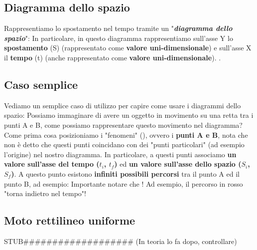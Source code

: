	\subsection{Diagramma dello spazio}
		Rappresentiamo lo spostamento nel tempo tramite un "\textit{\textbf{diagramma dello spazio}}":
		In particolare, in questo diagramma rappresentiamo sull'asse Y lo \textbf{spostamento} (S) (rappresentato come \textbf{valore uni-dimensionale}) e sull'asse X il \textbf{tempo} (t) (anche rappresentato come \textbf{valore uni-dimensionale}). .

	\subsection{Caso semplice}
		Vediamo un semplice caso di utilizzo per capire come usare i diagrammi dello spazio:
		Possiamo immaginare di avere un oggetto in movimento su una retta tra i punti A e B, come possiamo rappresentare questo movimento nel diagramma? Come prima cosa posizioniamo i "fenomeni" (), ovvero i \textbf{punti A e B}, nota che non è detto che questi punti coincidano con dei "punti particolari" (ad esempio l'origine) nel nostro diagramma. In particolare, a questi punti associamo \textbf{un valore sull'asse del tempo ($t_i$, $t_f$)} ed \textbf{un valore sull'asse dello spazio ($S_i$, $S_f$)}.
		A questo punto esistono \textbf{infiniti possibili percorsi} tra il punto A ed il punto B, ad esempio:
		Importante notare che ! Ad esempio, il percorso in rosso "torna indietro nel tempo"!

	\subsection{Moto rettilineo uniforme}
		STUB\#\#\#\#\#\#\#\#\#\#\#\#\#\#\#\#\#\#\# (In teoria lo fa dopo, controllare)

